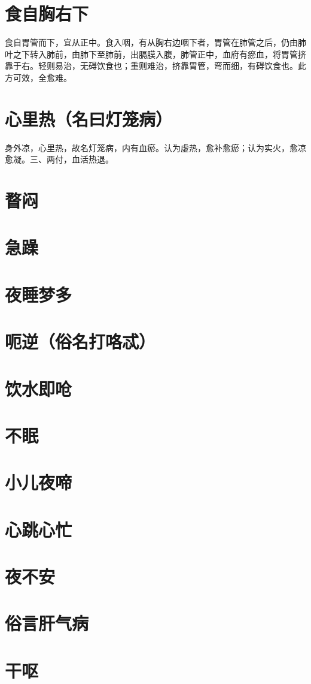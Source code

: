 \documentclass[a4paper,12pt,UTF8,twoside]{ctexbook}
\begin{document}
	\section{食自胸右下}
	食自胃管而下，宜从正中。食入咽，有从胸右边咽下者，胃管在肺管之后，仍由肺叶之下转入肺前，由肺下至肺前，出膈膜入腹，肺管正中，血府有瘀血，将胃管挤靠于右。轻则易治，无碍饮食也；重则难治，挤靠胃管，弯而细，有碍饮食也。此方可效，全愈难。
	\section{心里热（名曰灯笼病）}
	身外凉，心里热，故名灯笼病，内有血瘀。认为虚热，愈补愈瘀；认为实火，愈凉愈凝。三、两付，血活热退。
	\section{瞀闷}
	\section{急躁}
	\section{夜睡梦多}
	\section{呃逆（俗名打咯忒）}
	\section{饮水即呛}
	\section{不眠}
	\section{小儿夜啼}
	\section{心跳心忙}
	\section{夜不安}
	\section{俗言肝气病}
	\section{干呕}
\end{document}
